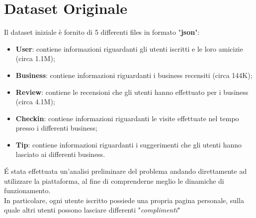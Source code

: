 
\chapter{Dataset Originale}
Il dataset iniziale è fornito di 5 differenti files in formato "\textbf{json}":
\begin{itemize}
	\item \textbf{User}: contiene informazioni riguardanti gli utenti iscritti e le loro amicizie (circa 1.1M);
	\item \textbf{Business}: contiene informazioni riguardanti i business recensiti (circa 144K);
	\item \textbf{Review}: contiene le recensioni che gli utenti hanno effettuato per i business (circa 4.1M);
	\item \textbf{Checkin}: contiene informazioni riguardanti le visite effettuate nel tempo presso i differenti business;
	\item \textbf{Tip}: contiene informazioni riguardanti i suggerimenti che gli utenti hanno lasciato ai differenti business.
\end{itemize}

\'E stata effettuata un'analisi preliminare del problema andando direttamente ad utilizzare la piattaforma, al fine di comprenderne meglio le dinamiche di funzionamento.\\
In particolare, ogni utente iscritto possiede una propria pagina personale, sulla quale altri utenti possono lasciare differenti "\textit{complimenti}"
